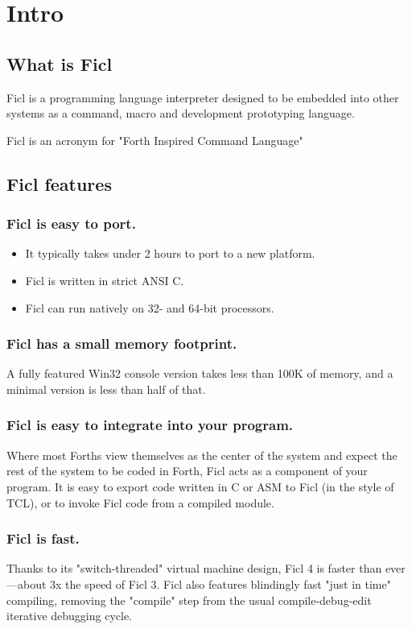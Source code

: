 \chapter{Intro}
\section{What is Ficl}
Ficl is a programming language interpreter designed to be embedded
into other systems as a command, macro and development
prototyping language.

Ficl is an acronym for "Forth Inspired Command Language"
\section{Ficl features}
\subsection{Ficl is \textbf{easy to port}.}
\begin{itemize}[noitemsep]
	\item It typically takes under 2 hours to port to a new platform.
	\item Ficl is written in strict ANSI C.
	\item Ficl can run natively on 32- and 64-bit processors.
\end{itemize}
\subsection{Ficl has a \textbf{small memory footprint}.}
A fully featured Win32 console version takes less than 100K of
memory, and a minimal version is less than half of that.
\subsection{Ficl is \textbf{easy to integrate} into your program.}
Where most Forths view themselves as the center of the system
and expect the rest of the system to be coded in Forth, Ficl
acts as a component of your program.  It is easy to export code
written in C or ASM to Ficl (in the style of TCL), or to invoke Ficl
code from a compiled module.
\subsection{Ficl is \textbf{fast}.}
Thanks to its "switch-threaded" virtual machine design, Ficl 4 is faster
than ever—about 3x the speed of Ficl 3. Ficl also features blindingly
fast "just in time" compiling, removing the "compile" step from the
usual compile-debug-edit iterative debugging cycle.
